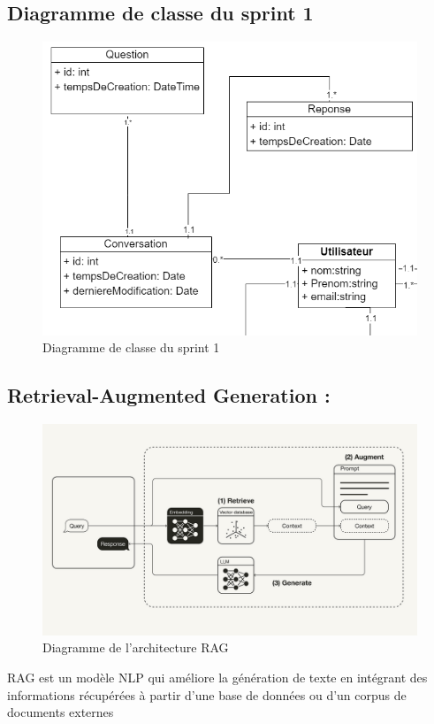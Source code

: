 \documentclass[a4paper, 11pt, openany]{report}
\begin{document}
\subsection{Diagramme de classe du sprint 1}
\begin{figure}[H]
\centering
\includegraphics[width=\textwidth]{sprint1-class.png}
\caption{Diagramme de classe du sprint 1}
\label{fig:sprint1_class}
\end{figure}
\FloatBarrier
\subsection{Retrieval-Augmented Generation :}
\clearpage
\begin{figure}[H]
\centering
\includegraphics[width=\textwidth]{images/rag.png} 
\caption{Diagramme de l'architecture RAG}
\label{fig:rag}
\end{figure}
RAG est un modèle NLP qui améliore la génération de texte en intégrant des informations récupérées à partir d'une base de données ou d'un corpus de documents externes
\end{document}
